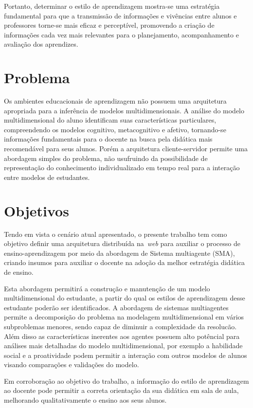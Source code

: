 Portanto, determinar o estilo de aprendizagem mostra-se uma estratégia fundamental para que a transmissão de informações e vivências entre alunos e professores torne-se mais eficaz e perceptível, promovendo a criação de informações cada vez mais relevantes para o planejamento, acompanhamento e avaliação dos aprendizes.

\section{Problema}
Os ambientes educacionais de aprendizagem não possuem uma arquitetura apropriada para a inferência de modelos multidimensionais. A análise do modelo multidimensional do aluno identificam suas características particulares, compreendendo os modelos cognitivo, metacognitivo e afetivo, tornando-se informações fundamentais para o docente na busca pela didática mais recomendável para seus alunos. Porém a arquitetura cliente-servidor permite uma abordagem simples do problema, não usufruindo da possibilidade de representação do conhecimento individualizado em tempo real para a interação entre modelos de estudantes.

\section{Objetivos}
Tendo em vista o cenário atual apresentado, o presente trabalho tem como objetivo definir uma arquitetura distribuída na~\emph{web} para auxiliar o processo de ensino-aprendizagem por meio da abordagem de Sistema multiagente (SMA), criando insumos para auxiliar o docente na adoção da melhor estratégia didática de ensino.

Esta abordagem permitirá a construção e manutenção de um modelo multidimensional do estudante, a partir do qual os estilos de aprendizagem desse estudante poderão ser identificados. A abordagem de sistemas multiagentes permite a decomposição do problema na modelagem multidimensional em vários subproblemas menores, sendo capaz de diminuir a complexidade da resolucão. Além disso as características inerentes aos agentes possuem alto potêncial para análises mais detalhadas do modelo multidimensional, por exemplo a habilidade social e a proatividade podem permitir a interação com outros modelos de alunos visando comparações e validações do modelo.

Em corroboração ao objetivo do trabalho, a informação do estilo de aprendizagem ao docente pode permitir a correta orientação da sua didática em sala de aula, melhorando qualitativamente o ensino aos seus alunos.

